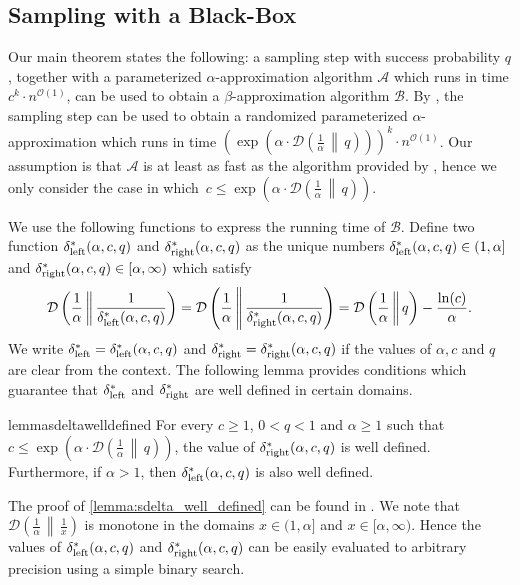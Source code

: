 \documentclass[letterpaper,11pt]{article}
\newcommand{\1}[1]{\mathds{1}\left[#1\right]}
\newcommand{\D}[2]{\mathcal{D}\left(#1\, \middle\|\,#2 \right)}
\newcommand{\Oh}{\mathcal{O}}
\newcommand{\sdeltal}{\delta^{*}_{\textnormal{left}}}
\newcommand{\sdeltar}{\delta^{*}_{\textnormal{right}}}
\begin{document}
 

\subsection{Sampling with a Black-Box}
\label{sec:blackboxsampling}

Our main theorem states the following: a sampling step with success probability $q$, together with a parameterized $\alpha$-approximation algorithm $\mathcal{A}$ which runs in time $c^k\cdot n^{\Oh(1)}$, can be used to obtain a $\beta$-approximation algorithm $\mathcal{B}$. 
By , the sampling step can be used to obtain a randomized parameterized $\alpha$-approximation which runs in time $\left( \exp\left(\alpha\cdot \D{\frac{1}{\alpha}}{q}\right)\right)^k\cdot n^{\Oh(1)}$. Our assumption is that $\mathcal{A}$ is at least as fast as the algorithm provided by , hence we only consider the case in which~$c\leq  \exp\left(\alpha\cdot \D{\frac{1}{\alpha}}{q}\right)$. 

We use the following functions to express the running time of $\mathcal{B}$.  Define two function $\sdeltal(\alpha,c,q)$ and  $\sdeltar(\alpha,c,q)$ as the unique numbers $\sdeltal(\alpha,c,q)\in \left(1,\alpha \right]$ and $\sdeltar(\alpha,c,q)\in \left[\alpha,\infty \right)$ which satisfy
	\begin{equation}\label{eq:deltast_def}
	\D{\frac{1}{\alpha}}{\frac{1}{\sdeltal(\alpha,c,q)}} = \D{\frac{1}{\alpha}}{\frac{1}{\sdeltar(\alpha,c,q)}}= \D{\frac{1}{\alpha}}{q} - \frac{\ln(c)}{\alpha}.
\end{equation}
	We write \(\sdeltal = \sdeltal(\alpha,c,q)\) and \(\sdeltar = \sdeltar(\alpha,c,q)\) if the values of $\alpha, c$ and $q$ are clear from the context.
The following lemma provides conditions which guarantee that $\sdeltal$ and $\sdeltar$ are well defined in certain domains.
\begin{restatable}{lemma}{sdeltawelldefined}\label{lemma:sdelta_well_defined}
For every $c\geq 1$, $0<q<1$ and $\alpha\geq 1$ such that $c\leq \exp\left(\alpha\cdot \D{\frac{1}{\alpha}}{q}\right)$, the value of $\sdeltar(\alpha,c,q)$ is well defined. Furthermore, if $\alpha>1$, then $\sdeltal(\alpha,c,q)$ is also well defined.	
\end{restatable}

The proof of \cref{lemma:sdelta_well_defined} can be found in .
We note that $\D{\frac{1}{\alpha}}{\frac{1}{x}}$ is monotone in  the domains  $x\in (1,\alpha]$ and $x\in [\alpha,\infty)$. Hence the values of  $\sdeltal(\alpha,c,q)$  and $\sdeltar(\alpha,c,q)$ can be easily evaluated to arbitrary precision using  a simple binary search. 
\end{document}
